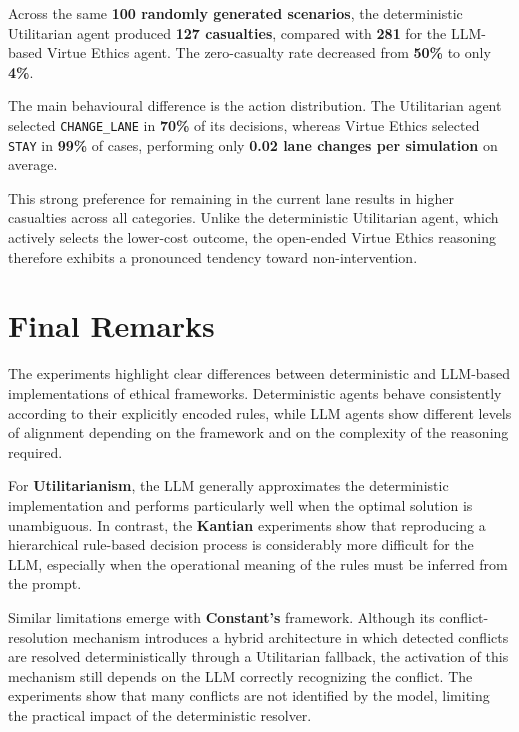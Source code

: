 \documentclass[10pt,a4paper]{article}
\begin{document}
Across the same \textbf{100 randomly generated scenarios}, the deterministic
Utilitarian agent produced \textbf{127 casualties}, compared with
\textbf{281} for the LLM-based Virtue Ethics agent. The zero-casualty rate
decreased from \textbf{50\%} to only \textbf{4\%}.

The main behavioural difference is the action distribution. The Utilitarian
agent selected \texttt{CHANGE\_LANE} in \textbf{70\%} of its decisions,
whereas Virtue Ethics selected \texttt{STAY} in \textbf{99\%} of cases,
performing only \textbf{0.02 lane changes per simulation} on average.

This strong preference for remaining in the current lane results in higher
casualties across all categories. Unlike the deterministic Utilitarian agent,
which actively selects the lower-cost outcome, the open-ended Virtue Ethics
reasoning therefore exhibits a pronounced tendency toward non-intervention.



\newpage
\section{Final Remarks}

The experiments highlight clear differences between deterministic and
LLM-based implementations of ethical frameworks. Deterministic agents behave
consistently according to their explicitly encoded rules, while LLM agents
show different levels of alignment depending on the framework and on the
complexity of the reasoning required.

For \textbf{Utilitarianism}, the LLM generally approximates the deterministic
implementation and performs particularly well when the optimal solution is
unambiguous. In contrast, the \textbf{Kantian} experiments show that reproducing a
hierarchical rule-based decision process is considerably more difficult for
the LLM, especially when the operational meaning of the rules must be inferred
from the prompt.

Similar limitations emerge with \textbf{Constant's} framework. Although its
conflict-resolution mechanism introduces a hybrid architecture in which
detected conflicts are resolved deterministically through a Utilitarian
fallback, the activation of this mechanism still depends on the LLM correctly
recognizing the conflict. The experiments show that many conflicts are not
identified by the model, limiting the practical impact of the deterministic
resolver.
\end{document}
